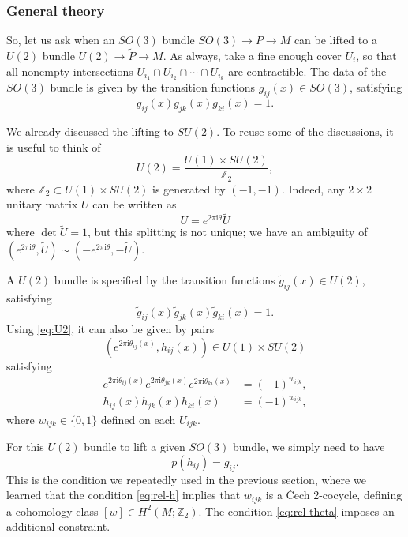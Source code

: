 \documentclass[12pt]{article}
\numberwithin{equation}{section}
\theoremstyle{remark}
\def\bZ{\mathbb{Z}}
\def\I{\mathrm{i}}
\begin{document}
\subsubsection{General theory}

So, let us ask when an $SO(3)$ bundle $SO(3)\to P\to M$ can be lifted to a $U(2)$ bundle $U(2)\to \tilde P\to M$.
As always, take a fine enough cover $U_i$, so that all nonempty intersections $U_{i_1}\cap U_{i_2}\cap \cdots \cap U_{i_k}$ are contractible.
The data of the $SO(3)$ bundle is given by the transition functions $g_{ij}(x)\in SO(3)$, satisfying \begin{equation}
  g_{ij}(x)g_{jk}(x)g_{ki}(x)=1.
\end{equation}

We already discussed the lifting to $SU(2)$. 
To reuse some of the discussions,
it is useful to think of \begin{equation}
U(2) = \frac{U(1)\times SU(2)}{\bZ_2}, \label{eq:U2}
\end{equation} where $\bZ_2 \subset U(1)\times SU(2)$ is generated by $(-1,-1)$.
Indeed, any $2\times 2$ unitary matrix $U$ can be written as \begin{equation}
U= e^{2\pi\I \theta} \tilde U
\end{equation} where $\det\tilde U=1$, but this splitting is not unique;
we have an ambiguity of $(e^{2\pi\I \theta},\tilde U) \sim (-e^{2\pi\I \theta},-\tilde U)$.

A $U(2)$ bundle is specified by the transition functions $\tilde g_{ij}(x)\in U(2)$, satisfying \begin{equation}
  \tilde g_{ij}(x)\tilde g_{jk}(x)\tilde g_{ki}(x)=1.
\end{equation}
Using \eqref{eq:U2}, it can also be given by pairs \begin{equation}
(e^{2\pi\I\theta_{ij}(x)},h_{ij}(x))\in U(1)\times SU(2)
\end{equation} satisfying \begin{align}
  e^{2\pi\I\theta_{ij}(x)}e^{2\pi\I\theta_{jk}(x)}e^{2\pi\I\theta_{ki}(x)}&=(-1)^{w_{ijk}},\label{eq:rel-theta}\\
  h_{ij}(x)h_{jk}(x)h_{ki}(x)&=(-1)^{w_{ijk}},\label{eq:rel-h}
\end{align}
where $w_{ijk}\in \{0,1\}$ defined on each $U_{ijk}$.

For this $U(2)$ bundle to lift a given $SO(3)$ bundle, we simply need to have \begin{equation}
p(h_{ij})=g_{ij}.
\end{equation}
This is the condition we repeatedly used in the previous section,
where we learned that the condition \eqref{eq:rel-h}
implies that  $w_{ijk}$ is a \v Cech 2-cocycle,
defining a cohomology class $[w]\in H^2(M;\bZ_2)$.
The condition \eqref{eq:rel-theta} imposes an additional constraint.
\end{document}
